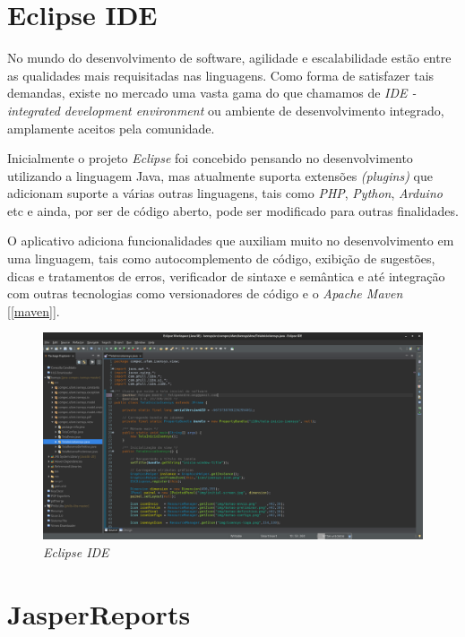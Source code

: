 \documentclass[
	12pt,			%
	openright,		%
	oneside,	
	a4paper,		%
	english,		%
	brazil			%
]{abntex2/abntex2}  %
\begin{document}
		\section{Eclipse IDE}
		
			No mundo do desenvolvimento de software, agilidade e escalabilidade estão entre as qualidades mais requisitadas nas linguagens. Como forma de satisfazer tais demandas, existe no mercado uma vasta gama do que chamamos de \textit{IDE - integrated development environment} ou ambiente de desenvolvimento integrado, amplamente aceitos pela comunidade.
			
			Inicialmente o projeto \textit{Eclipse} \cite{eclipse} foi concebido pensando no desenvolvimento utilizando a linguagem Java, mas atualmente suporta extensões \textit{(plugins)} que adicionam suporte a várias outras linguagens, tais como \textit{PHP}, \textit{Python}, \textit{Arduino} etc e ainda, por ser de código aberto, pode ser modificado para outras finalidades.
			
			O aplicativo adiciona funcionalidades que auxiliam muito no desenvolvimento em uma linguagem, tais como autocomplemento de código, exibição de sugestões, dicas e tratamentos de erros, verificador de sintaxe e semântica e até integração com outras tecnologias como versionadores de código e o \textit{Apache Maven} [\ref{maven}].
			
			\begin{figure}[ht]
				\begin{center}
					
					\caption{\textit{Eclipse IDE}}
					\includegraphics[scale=0.2]{img/eclipse-ide}
					
				\end{center}
			\end{figure}
		
		\section{JasperReports\textregistered}
		
\end{document}

